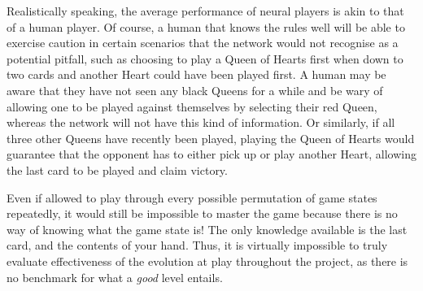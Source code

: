 \documentclass[12pt,a4paper]{article}
\begin{document}
Realistically speaking, the average performance of neural players is akin to that of a human player. Of course, a human that knows the rules well will be able to exercise caution in certain scenarios that the network would not recognise as a potential pitfall, such as choosing to play a Queen of Hearts first when down to two cards and another Heart could have been played first. A human may be aware that they have not seen any black Queens for a while and be wary of allowing one to be played against themselves by selecting their red Queen, whereas the network will not have this kind of information. Or similarly, if all three other Queens have recently been played, playing the Queen of Hearts would guarantee that the opponent has to either pick up or play another Heart, allowing the last card to be played and claim victory. 

Even if allowed to play through every possible permutation of game states repeatedly, it would still be impossible to master the game because there is no way of knowing what the game state is! The only knowledge available is the last card, and the contents of your hand. Thus, it is virtually impossible to truly evaluate effectiveness of the evolution at play throughout the project, as there is no benchmark for what a \textit{good} level entails. 

\newpage



\end{document}
